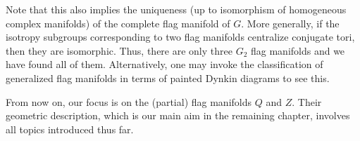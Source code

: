 Note that this also implies the uniqueness (up to isomorphism of homogeneous complex manifolds) of the complete flag manifold of $G$. More generally, if the isotropy subgroups corresponding to two flag manifolds centralize conjugate tori, then they are isomorphic. Thus, there are only three $G_2$ flag manifolds and we have found all of them. Alternatively, one may invoke the classification of generalized flag manifolds in terms of painted Dynkin diagrams to see this.

From now on, our focus is on the (partial) flag manifolds $Q$ and $Z$. Their geometric description, which is our main aim in the remaining chapter, involves all topics introduced thus far.